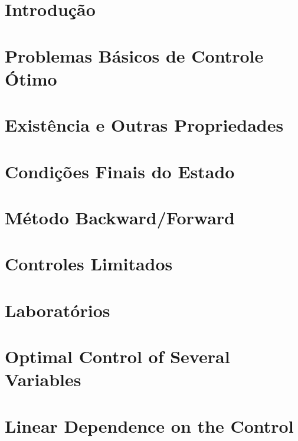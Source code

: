 \documentclass[a4paper, 11pt, oneside]{book}
\theoremstyle{definition}
\begin{document}


\tableofcontents

\chapter{Introdução}
\label{ch:intro}


\chapter{Problemas Básicos de Controle Ótimo}
\label{ch:1}


\chapter{Existência e Outras Propriedades}
\label{ch:2}


\chapter{Condições Finais do Estado}
\label{ch:3}


\chapter{Método Backward/Forward}
\label{ch:4}


\chapter{Controles Limitados}


\chapter{Laboratórios}


\chapter{Optimal Control of Several Variables}


\chapter{Linear Dependence on the Control}



\end{document}
